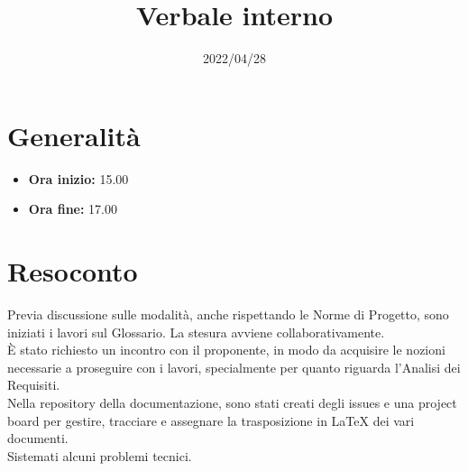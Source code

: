 \documentclass{classes/base}
\title{Verbale interno}
\date{2022/04/28}
\author{\marcov}
\renewcommand{\maketitle}{
    
}
\begin{document}
    \maketitle

    \section*{Generalità}
    \begin{itemize}
        \item \textbf{Ora inizio:} 15.00
        \item \textbf{Ora fine:} 17.00
    \end{itemize}

    \section*{Resoconto}
    Previa discussione sulle modalità, anche rispettando le Norme di Progetto, sono iniziati i lavori sul Glossario. La stesura avviene collaborativamente.\\
    È stato richiesto un incontro con il proponente, in modo da acquisire le nozioni necessarie a proseguire con i lavori, specialmente per quanto riguarda l'Analisi dei Requisiti.\\
    Nella repository della documentazione, sono stati creati degli issues e una project board per gestire, tracciare e assegnare la trasposizione in \LaTeX{} dei vari documenti.\\
    Sistemati alcuni problemi tecnici.
\end{document}
